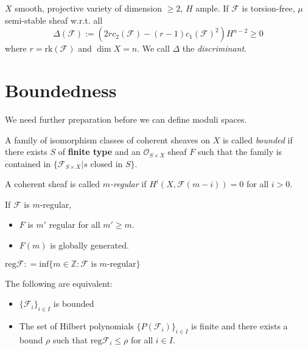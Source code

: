 \begin{theorem}
\label{theorem-Bogomolov-inequality}
$X$ smooth, projective variety of dimension $\geq 2$, $H$ ample. If
$\mathcal{F}$ is torsion-free, $\mu$ semi-stable sheaf w.r.t. all
$$
\Delta(\mathcal{F}):=(2rc_2(\mathcal{F})-
(r-1)c_1(\mathcal{F})^2)H^{n-2}\geq 0
$$
where $r=\text{rk}(\mathcal{F})$ and $\dim X=n$. We call $\Delta$ the {\it
discriminant}.
\end{theorem}

\section{Boundedness}
\label{section-boundedness}

We need further preparation before we can define moduli spaces.

\begin{definition}
\label{definition-bounded-family}
A family of isomorphism classes of coherent sheaves on $X$ is called {\it
bounded} if there exists $S$ of {\bf finite type} and an 
$\mathcal{O}_{S \times X}$ sheaf $F$ such that the family is contained in
 $\{ \mathcal{F}_{S \times X}|s  \text{ closed in }S\}$.
\end{definition}

\begin{definition}
\label{definition-m-regularity}
A coherent sheaf is called {\it $m$-regular} if $H^{i}(X,\mathcal{F}(m-i))=0$
for all $i>0$.
\end{definition}

\begin{proposition}
\label{proposition-m-regularity}
If $\mathcal{F}$ is $m$-regular,
\begin{itemize}
\item $F$ is $m'$ regular for all $m' \geq m$.
\item $F(m)$ is globally generated.
\end{itemize}
\end{proposition}

\begin{definition}
\label{definition-regular-infimum}
$\text{reg}\mathcal{F}:
=\text{inf}\{m \in \mathbb{Z}:\mathcal{F}\text{ is $m$-regular}\}$
\end{definition}

\begin{lemma}
\label{lemma-}
The following are equivalent:
\begin{itemize}
\item $\{\mathcal{F}_i\}_{i \in I}$ is bounded
\item The set of Hilbert polynomials $\{P(\mathcal{F}_i)\}_{i \in I}$ is finite
and there exists a bound $\rho$ such that $\text{reg}\mathcal{F}_i\leq \rho$ for
all $i \in I$.
\end{itemize}
\end{lemma}

